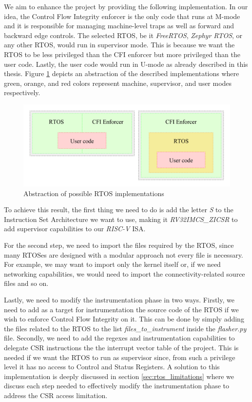 We aim to enhance the project by providing the following implementation. In our
idea, the Control Flow Integrity enforcer is the only code that runs at M-mode and
it is responsible for managing machine-level traps as well as forward and backward
edge controls. The selected RTOS, be it \textit{FreeRTOS}, \textit{Zephyr RTOS},
or any other RTOS, would run in supervisor mode. This is because we want the RTOS
to be less privileged than the CFI enforcer but more privileged than the user code.
Lastly, the user code would run in U-mode as already described in this thesis.
Figure \ref{fig:rtos} depicts an abstraction of the described implementations
where green, orange, and red colors represent machine, supervisor, and user
modes respectively. \\
\begin{figure}[htbp]
  \centering
  \includegraphics[width=\linewidth]{images/rtos.png}
  \caption{Abstraction of possible RTOS implementations}
  \label{fig:rtos}
\end{figure}

To achieve this result, the first thing we need to do is add the letter \textit{S}
to the Instruction Set Architecture we want to use, making it \textit{RV32IMCS\_ZICSR}
to add supervisor capabilities to our \textit{RISC-V} ISA.

For the second step, we need to import the files required by the RTOS, since many
RTOSes are designed with a modular approach not every file is necessary. For
example, we may want to import only the kernel itself or, if we need networking
capabilities, we would need to import the connectivity-related source files and so
on.

Lastly, we need to modify the instrumentation phase in two ways. Firstly, we
need to add as a target for instrumentation the source code of the RTOS if we
wish to enforce Control Flow Integrity on it. This can be done by simply adding the
files related to the RTOS to the list \textit{files\_to\_instrument} inside the
\textit{flasher.py} file. Secondly, we need to add the regexes and instrumentation
capabilities to delegate CSR instructions the the interrupt vector table of the project.
This is needed if we want the RTOS to run as supervisor since, from such a privilege
level it has no access to Control and Status Registers. A solution to this
implementation is deeply discussed in section \ref{sec:rtos_limitations} where
we discuss each step needed to effectively modify the instrumentation phase to
address the CSR access limitation.

